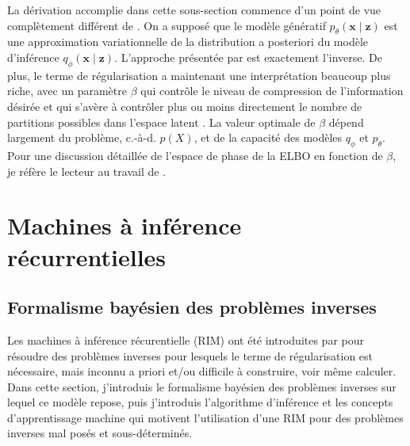La dérivation accomplie dans cette sous-section commence d'un point de vue complètement différent 
de \citet{Kingma2013}. On 
a supposé que le modèle génératif $p_\theta(\mathbf{x} \mid \mathbf{z})$ est une approximation variationnelle de 
la distribution a posteriori du modèle 
d'inférence $q_\phi(\mathbf{x} \mid \mathbf{z})$. L'approche présentée par \citet{Kingma2013} est exactement l'inverse.
De plus, le terme de régularisation a maintenant une interprétation beaucoup plus riche, avec un paramètre 
$\beta$ qui contrôle le niveau de compression de l'information désirée et qui s'avère à contrôler plus ou moins 
directement le nombre de partitions possibles dans l'espace latent \citep{Alemi2017,Rezende2018}.
La valeur optimale de $\beta$ dépend largement du problème, c.-à-d. $p(X)$, et de 
la capacité des modèles $q_\phi$ et $p_\theta$. 
Pour une discussion détaillée de l'espace de phase de la ELBO en fonction de $\beta$, je réfère le lecteur 
au travail de \citet{Alemi2018}.


\section{Machines à inférence récurrentielles}\label{sec:intro rim}

\subsection{Formalisme bayésien des problèmes inverses}

Les machines à inférence récurentielle (RIM) ont été introduites par \citet{Putzky2017} pour résoudre des problèmes 
inverses pour lesquels le terme de régularisation est nécessaire, mais inconnu a priori et/ou difficile à 
construire, voir même calculer. Dans cette section, j'introduis le formalisme bayésien des problèmes inverses sur lequel 
ce modèle repose, puis j'introduis l'algorithme d'inférence et les concepts d'apprentissage machine qui motivent 
l'utilisation d'une RIM pour des problèmes inverses mal posés et sous-déterminés.

